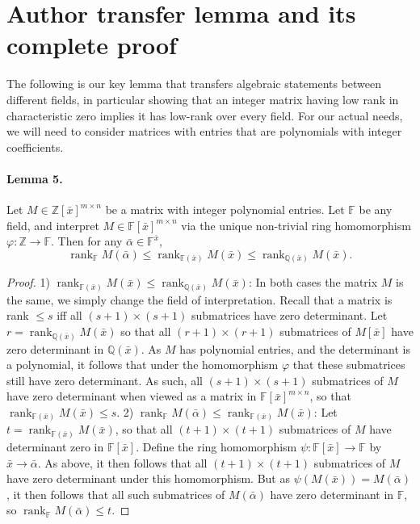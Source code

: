 \section*{Author transfer lemma and its complete proof}
The following is our key lemma that transfers algebraic statements between different fields, in particular showing that an integer matrix having low rank in characteristic zero implies it has low-rank over every field. For our actual needs, we will need to consider matrices with entries that are polynomials with integer coefficients.
\paragraph{Lemma 5.} Let $M\in\mathbb Z[\bar x]^{m\times n}$ be a matrix with integer polynomial entries. Let $\mathbb F$ be any field, and interpret $M\in\mathbb F[\bar x]^{m\times n}$ via the unique non-trivial ring homomorphism $\varphi:\mathbb Z\to\mathbb F$. Then for any $\bar\alpha\in\mathbb F^{\bar x}$,
\[\operatorname{rank}_{\mathbb F}M(\bar\alpha)\le\operatorname{rank}_{\mathbb F(\bar x)}M(\bar x)\le\operatorname{rank}_{\mathbb Q(\bar x)}M(\bar x).\]
\begin{proof}
1) $\operatorname{rank}_{\mathbb F(\bar x)}M(\bar x)\le\operatorname{rank}_{\mathbb Q(\bar x)}M(\bar x)$: In both cases the matrix $M$ is the same, we simply change the field of interpretation. Recall that a matrix is rank $\le s$ iff all $(s+1)\times(s+1)$ submatrices have zero determinant. Let $r=\operatorname{rank}_{\mathbb Q(\bar x)}M(\bar x)$ so that all $(r+1)\times(r+1)$ submatrices of $M[\bar x]$ have zero determinant in $\mathbb Q(\bar x)$. As $M$ has polynomial entries, and the determinant is a polynomial, it follows that under the homomorphism $\varphi$ that these submatrices still have zero determinant. As such, all $(s+1)\times(s+1)$ submatrices of $M$ have zero determinant when viewed as a matrix in $\mathbb F[\bar x]^{m\times n}$, so that $\operatorname{rank}_{\mathbb F(\bar x)}M(\bar x)\le s$.
2) $\operatorname{rank}_{\mathbb F}M(\bar\alpha)\le\operatorname{rank}_{\mathbb F(\bar x)}M(\bar x)$: Let $t=\operatorname{rank}_{\mathbb F(\bar x)}M(\bar x)$, so that all $(t+1)\times(t+1)$ submatrices of $M$ have determinant zero in $\mathbb F[\bar x]$. Define the ring homomorphism $\psi:\mathbb F[\bar x]\to\mathbb F$ by $\bar x\to\bar\alpha$. As above, it then follows that all $(t+1)\times(t+1)$ submatrices of $M$ have zero determinant under this homomorphism. But as $\psi(M(\bar x))=M(\bar\alpha)$, it then follows that all such submatrices of $M(\bar\alpha)$ have zero determinant in $\mathbb F$, so $\operatorname{rank}_{\mathbb F}M(\bar\alpha)\le t$.
\end{proof}
